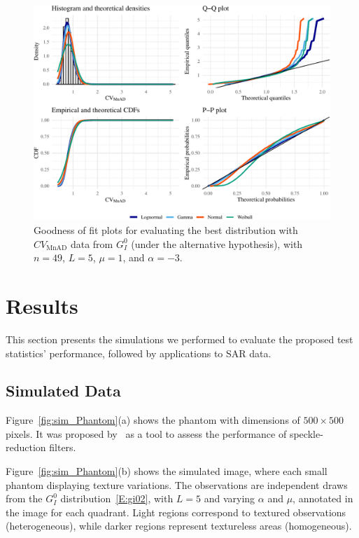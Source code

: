 \documentclass[remotesensing,article,submit,moreauthors,pdftex]{Definitions/mdpi}
\providecommand{\DIFaddbeginFL}{} %
\providecommand{\DIFaddendFL}{} %
\providecommand{\DIFdelbeginFL}{} %
\providecommand{\DIFdelendFL}{} %
\newcommand{\DIFscaledelfig}{0.5}
\newlength{\DIFdelgraphicswidth} %
\newlength{\DIFdelgraphicsheight} %
\newcommand{\DIFaddincludegraphics}[2][]{{\color{blue}\fbox{\DIFOincludegraphics[#1]{#2}}}} %
\newcommand{\DIFdelincludegraphics}[2][]{%
\sbox{\DIFdelgraphicsbox}{\DIFOincludegraphics[#1]{#2}}%
\settoboxwidth{\DIFdelgraphicswidth}{\DIFdelgraphicsbox} %
\settoboxtotalheight{\DIFdelgraphicsheight}{\DIFdelgraphicsbox} %
\scalebox{\DIFscaledelfig}{%
\parbox[b]{\DIFdelgraphicswidth}{\usebox{\DIFdelgraphicsbox}\\[-\baselineskip] \rule{\DIFdelgraphicswidth}{0em}}\llap{\resizebox{\DIFdelgraphicswidth}{\DIFdelgraphicsheight}{%
\setlength{\unitlength}{\DIFdelgraphicswidth}%
\begin{picture}(1,1)%
\thicklines\linethickness{2pt} %
{\color[rgb]{1,0,0}\put(0,0){\framebox(1,1){}}}%
{\color[rgb]{1,0,0}\put(0,0){\line( 1,1){1}}}%
{\color[rgb]{1,0,0}\put(0,1){\line(1,-1){1}}}%
\end{picture}%
}\hspace*{3pt}}} %
} %
\DeclareRobustCommand{\DIFaddbeginFL}{\DIFOaddbeginFL \let\includegraphics\DIFaddincludegraphics} %
\DeclareRobustCommand{\DIFaddendFL}{\DIFOaddendFL \let\includegraphics\DIFOincludegraphics} %
\DeclareRobustCommand{\DIFdelbeginFL}{\DIFOdelbeginFL \let\includegraphics\DIFdelincludegraphics} %
\DeclareRobustCommand{\DIFdelendFL}{\DIFOaddendFL \let\includegraphics\DIFOincludegraphics} %
\begin{document}
\begin{figure}[hbt]
\DIFdelbeginFL %
\DIFdelendFL \DIFaddbeginFL \includegraphics[width=1\linewidth]{R1-Identifying-Heterogeneity-in-SAR-Data-with-New-Test-Statistics_files/figure-latex/Plot_madmed_gi0_MnADmedian-1} \DIFaddendFL \caption{Goodness of fit plots for evaluating the best distribution with $CV_{\text{MnAD}}$ data from $G_I^0$ (under the alternative hypothesis), with  $n=49$, $L=5$, $\mu=1$, and $\alpha=-3$.}\label{fig:Plot_madmed_gi0_MnADmedian}
\end{figure}

\section{Results}\label{sec:Results}

This section presents the simulations we performed to evaluate the
proposed test statistics' performance, followed by applications to SAR
data.

\subsection{Simulated Data}\label{simulated-data}

Figure~\ref{fig:sim_Phantom}(a) shows the phantom with dimensions of
\(500\times500\) pixels. It was proposed by~\citet{Gomez2017} as a tool
to assess the performance of speckle-reduction filters.

Figure~\ref{fig:sim_Phantom}(b) shows the simulated image, where each
small phantom displaying texture variations. The observations are
independent draws from the \(G^0_I\) distribution~\eqref{E:gi02}, with
\(L = 5\) and varying \(\alpha\) and \(\mu\), annotated in the image for
each quadrant. Light regions correspond to textured observations
(heterogeneous), while darker regions represent textureless areas
(homogeneous).
\end{document}

